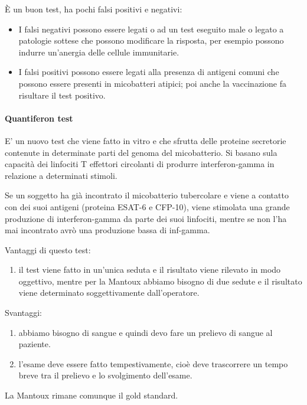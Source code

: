 È un buon test, ha pochi falsi positivi e negativi:
\begin{itemize}

\item I falsi negativi possono essere legati o ad un test eseguito male o
legato a patologie sottese che possono modificare la risposta, per
esempio possono indurre un'anergia delle cellule immunitarie.

\item  I falsi positivi possono essere legati alla presenza di antigeni
comuni che possono essere presenti in micobatteri atipici; poi anche la
vaccinazione fa risultare il test positivo.
\end{itemize}
\paragraph{Quantiferon test}


E' un nuovo test che viene fatto in vitro e che sfrutta delle proteine
secretorie contenute in determinate parti del genoma del micobatterio.
Si basano sula capacità dei linfociti T effettori circolanti di produrre
interferon-gamma in relazione a determinati stimoli.

Se un soggetto ha già incontrato il micobatterio tubercolare e viene a
contatto con dei suoi antigeni (proteina ESAT-6 e CFP-10), viene
stimolata una grande produzione di interferon-gamma da parte dei suoi
linfociti, mentre se non l'ha mai incontrato avrò una produzione bassa
di inf-gamma.

Vantaggi di questo test:
\begin{enumerate}

\item il test viene fatto in un'unica seduta e il risultato viene rilevato
in modo oggettivo, mentre per la Mantoux abbiamo bisogno di due sedute e
il risultato viene determinato soggettivamente dall'operatore.
\end{enumerate}
Svantaggi:
\begin{enumerate}

\item  abbiamo bisogno di sangue e quindi devo fare un prelievo di sangue al
paziente.

\item l'esame deve essere fatto tempestivamente, cioè deve trascorrere un
tempo breve tra il prelievo e lo svolgimento dell'esame.
\end{enumerate}
La Mantoux rimane comunque il gold standard.

